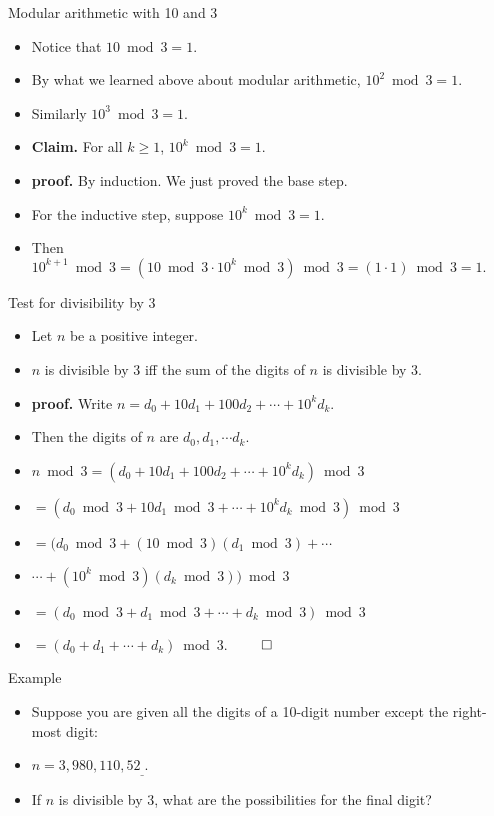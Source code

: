 \documentclass[handout]{beamer}
\begin{document}
\begin{frame}{Modular arithmetic with 10 and 3}
\begin{itemize}
  \item Notice that $10 \bmod 3 = 1$.
  \item By what we learned above about modular arithmetic, $10^2 \bmod 3 = 1$.
  \item Similarly $10^3 \bmod 3 = 1$.
  \item \textbf{Claim.} For all $k\geq 1$, $10^k \bmod 3 = 1$.
  \item \textbf{proof.} By induction. We just proved the base step.
  \item For the inductive step, suppose $10^k \bmod 3 = 1$.
  \item Then $10^{k+1}\bmod 3 = \left(10\bmod 3 \cdot 10^k \bmod 3 \right) \bmod 3 = (1\cdot 1) \bmod 3 = 1.$
\end{itemize}
\end{frame}

\begin{frame}{Test for divisibility by 3}
\begin{itemize}
  \item Let $n$ be a positive integer.
  \item $n$ is divisible by 3 iff the sum of the digits of $n$ is divisible by 3.
  \item \textbf{proof.} Write $n=d_0 + 10d_1 + 100 d_2 + \cdots + 10^k d_k$.
  \item Then the digits of $n$ are $d_0,d_1,\cdots d_k$.
  \item $n\bmod 3 = (d_0 + 10d_1 + 100 d_2 + \cdots + 10^k d_k)\bmod 3$
  \item  $=\left(d_0\bmod 3 + 10d_1\bmod 3 + \cdots + 10^k d_k \bmod 3 \right) \bmod 3$
  \item  $=\big(d_0\bmod 3 + (10\bmod 3)(d_1\bmod 3) + \cdots $
  \item  $  \cdots + (10^k\bmod 3) (d_k \bmod 3) \big) \bmod 3$
  \item  $=\left(d_0\bmod 3 + d_1\bmod 3 + \cdots + d_k \bmod 3 \right) \bmod 3$
  \item  $=\left(d_0 + d_1 + \cdots + d_k  \right) \bmod 3$. $\qed$
\end{itemize}
\end{frame}


\begin{frame}{Example}
\begin{itemize}
  \item Suppose you are given all the digits of a 10-digit number except the right-most digit:
  \item $n=3,980,110,52_{\_}$.
  \item If $n$ is divisible by 3, what are the possibilities for the final digit?
\end{itemize}
\end{frame}
\end{document}

